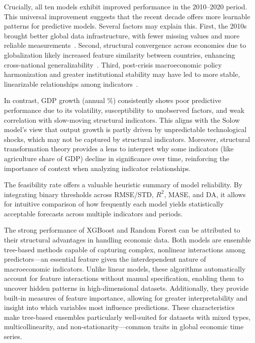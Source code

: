 \documentclass[12pt]{article}
\begin{document}
Crucially, all ten models exhibit improved performance in the 2010–2020 period. This universal improvement suggests that the recent decade offers more learnable patterns for predictive models. Several factors may explain this. First, the 2010s brought better global data infrastructure, with fewer missing values and more reliable measurements~\cite{jerven2013poor}. Second, structural convergence across economies due to globalization likely increased feature similarity between countries, enhancing cross-national generalizability~\cite{baldwin2016great}. Third, post-crisis macroeconomic policy harmonization and greater institutional stability may have led to more stable, linearizable relationships among indicators~\cite{blanchard2015inflation}.


In contrast, GDP growth (annual \%) consistently shows poor predictive performance due to its volatility, susceptibility to unobserved factors, and weak correlation with slow-moving structural indicators.
This aligns with the Solow model’s view that output growth is partly driven by unpredictable technological shocks, which may not be captured by structural indicators. Moreover, structural transformation theory\cite{Kuznets1971} provides a lens to interpret why some indicators (like agriculture share of GDP) decline in significance over time, reinforcing the importance of context when analyzing indicator relationships.

The feasibility rate offers a valuable heuristic summary of model reliability. By integrating binary thresholds across RMSE/STD, $R^2$, MASE, and DA, it allows for intuitive comparison of how frequently each model yields statistically acceptable forecasts across multiple indicators and periods.

The strong performance of XGBoost and Random Forest can be attributed to their structural advantages in handling economic data. Both models are ensemble tree-based methods capable of capturing complex, nonlinear interactions among predictors—an essential feature given the interdependent nature of macroeconomic indicators. Unlike linear models, these algorithms automatically account for feature interactions without manual specification, enabling them to uncover hidden patterns in high-dimensional datasets. Additionally, they provide built-in measures of feature importance, allowing for greater interpretability and insight into which variables most influence predictions. These characteristics make tree-based ensembles particularly well-suited for datasets with mixed types, multicollinearity, and non-stationarity—common traits in global economic time series.
\end{document}
